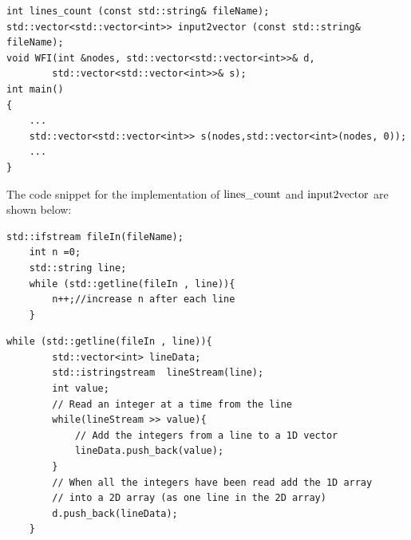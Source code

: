 \documentclass[a4paper,12pt]{article}%
\begin{document}
\begin{lstlisting}
int lines_count (const std::string& fileName);
std::vector<std::vector<int>> input2vector (const std::string& fileName);
void WFI(int &nodes, std::vector<std::vector<int>>& d, 
        std::vector<std::vector<int>>& s);
int main()
{  
	...    
    std::vector<std::vector<int>> s(nodes,std::vector<int>(nodes, 0)); 
    ...
}
\end{lstlisting}

The code snippet for the implementation of  $\lstinline{lines_count}$ and $\lstinline{input2vector}$ are shown below:
\begin{lstlisting}[title = $\lstinline{lines_count}$]
std::ifstream fileIn(fileName);
    int n =0;
    std::string line;
    while (std::getline(fileIn , line)){
        n++;//increase n after each line
    }
\end{lstlisting}

\begin{lstlisting}[title = $\lstinline{input2vector}$]
while (std::getline(fileIn , line)){
        std::vector<int> lineData;
        std::istringstream  lineStream(line);
        int value;
        // Read an integer at a time from the line
        while(lineStream >> value){
            // Add the integers from a line to a 1D vector
            lineData.push_back(value);
        }
        // When all the integers have been read add the 1D array
        // into a 2D array (as one line in the 2D array)
        d.push_back(lineData);
    }
\end{lstlisting}
\end{document}
